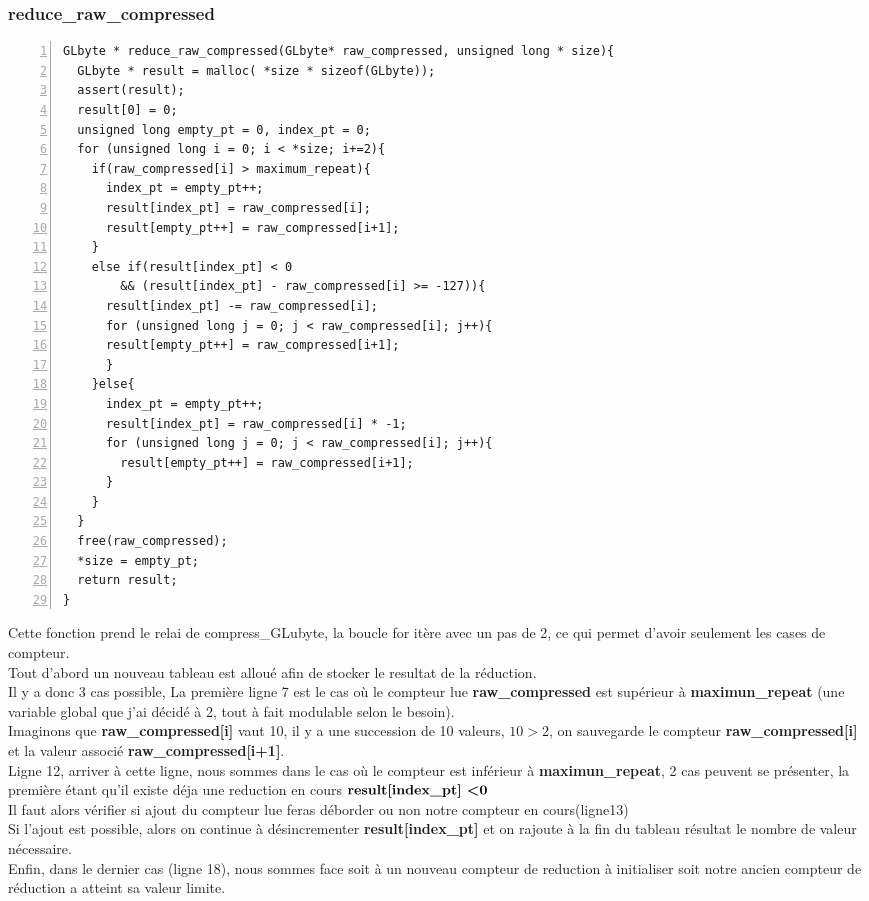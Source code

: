 \documentclass[12pt, letterpaper]{article}
\begin{document}
\subsubsection{reduce\_raw\_compressed}
\begin{Verbatim}[numbers=left,xleftmargin = 5mm]
GLbyte * reduce_raw_compressed(GLbyte* raw_compressed, unsigned long * size){
  GLbyte * result = malloc( *size * sizeof(GLbyte));
  assert(result);
  result[0] = 0;
  unsigned long empty_pt = 0, index_pt = 0;
  for (unsigned long i = 0; i < *size; i+=2){   
    if(raw_compressed[i] > maximum_repeat){
      index_pt = empty_pt++; 
      result[index_pt] = raw_compressed[i];
      result[empty_pt++] = raw_compressed[i+1];
    }
    else if(result[index_pt] < 0 
        && (result[index_pt] - raw_compressed[i] >= -127)){
      result[index_pt] -= raw_compressed[i];
      for (unsigned long j = 0; j < raw_compressed[i]; j++){
      result[empty_pt++] = raw_compressed[i+1];
      }    
    }else{
      index_pt = empty_pt++; 
      result[index_pt] = raw_compressed[i] * -1; 
      for (unsigned long j = 0; j < raw_compressed[i]; j++){
        result[empty_pt++] = raw_compressed[i+1];
      }
    }  
  }
  free(raw_compressed);
  *size = empty_pt; 
  return result;  
}
\end{Verbatim}
Cette fonction prend le relai de compress\_GLubyte, la boucle for itère avec un pas de 2, ce qui permet d'avoir seulement les cases de compteur.\\
Tout d'abord un nouveau tableau est alloué afin de stocker le resultat de la réduction.\\
Il y a donc 3 cas possible, La première ligne 7 est le cas où le compteur lue \textbf{raw\_compressed} est supérieur à \textbf{maximun\_repeat} (une variable global que j'ai décidé à 2, tout à fait modulable selon le besoin).\\
Imaginons que \textbf{raw\_compressed[i]} vaut 10, il y a une succession de 10 valeurs, 
\begin{math}10 > 2\end{math}, on sauvegarde le compteur \textbf{raw\_compressed[i]} 
et la valeur associé \textbf{raw\_compressed[i+1]}.\\
Ligne 12, arriver à cette ligne, nous sommes dans le cas où le compteur est inférieur à \textbf{maximun\_repeat},
2 cas peuvent se présenter, la première étant qu'il existe déja une reduction en cours
\begin{math}
    \textbf{result[index\_pt] \textless 0}
\end{math}\\
Il faut alors vérifier si ajout du compteur lue feras déborder ou non notre compteur en cours(ligne13)\\
Si l'ajout est possible, alors on continue à désincrementer \textbf{result[index\_pt]}
et on rajoute à la fin du tableau résultat le nombre de valeur nécessaire.\\
Enfin, dans le dernier cas (ligne 18), nous sommes face soit à un nouveau compteur de reduction à 
initialiser soit notre ancien compteur de réduction a atteint sa valeur limite.
\end{document}
